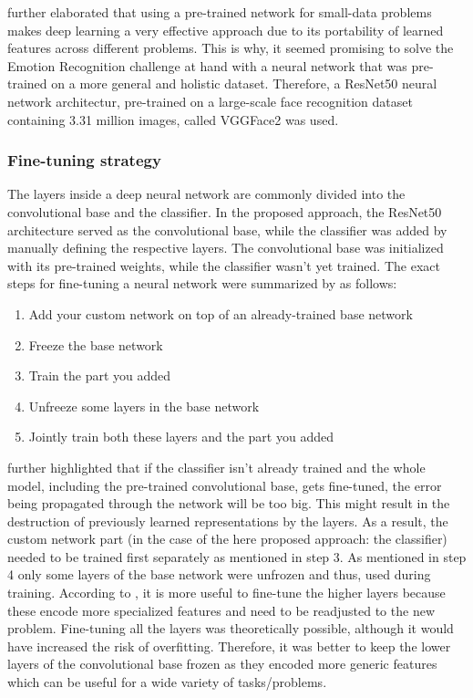 \citet{Chollet:2017:DeepLearningPython} further elaborated that using a pre-trained network for small-data problems makes deep learning a very effective approach due to its portability of learned features across different problems.
\newline\newline
This is why, it seemed promising to solve the Emotion Recognition challenge at hand with a neural network that was pre-trained on a more general and holistic dataset. Therefore, a ResNet50 neural network architectur, pre-trained on a large-scale face recognition dataset containing 3.31 million images, called VGGFace2 \citep{Cao:2018:VGGFace2} was used.


\subsubsection{Fine-tuning strategy}
The layers inside a deep neural network are commonly divided into the convolutional base and the classifier. In the proposed approach, the ResNet50 architecture served as the convolutional base, while the classifier was added by manually defining the respective layers. The convolutional base was initialized with its pre-trained weights, while the classifier wasn't yet trained.
\newline\newline
The exact steps for fine-tuning a neural network were summarized by \citet{Chollet:2017:DeepLearningPython} as follows:
\begin{enumerate}
    \item Add your custom network on top of an already-trained base network
    \item Freeze the base network
    \item Train the part you added
    \item Unfreeze some layers in the base network
    \item Jointly train both these layers and the part you added
\end{enumerate}

\citet{Chollet:2017:DeepLearningPython} further highlighted that if the classifier isn't already trained and the whole model, including the pre-trained convolutional base, gets fine-tuned, the error being propagated through the network will be too big. This might result in the destruction of previously learned representations by the layers. As a result, the custom network part (in the case of the here proposed approach: the classifier) needed to be trained first separately as mentioned in step 3. 
\newline\newline
As mentioned in step 4 only some layers of the base network were unfrozen and thus, used during training. According to \citet{Chollet:2017:DeepLearningPython}, it is more useful to fine-tune the higher layers because these encode more specialized features and need to be readjusted to the new problem. Fine-tuning all the layers was theoretically possible, although it would have increased the risk of overfitting. Therefore, it was better to keep the lower layers of the convolutional base frozen as they encoded more generic features which can be useful for a wide variety of tasks/problems.


